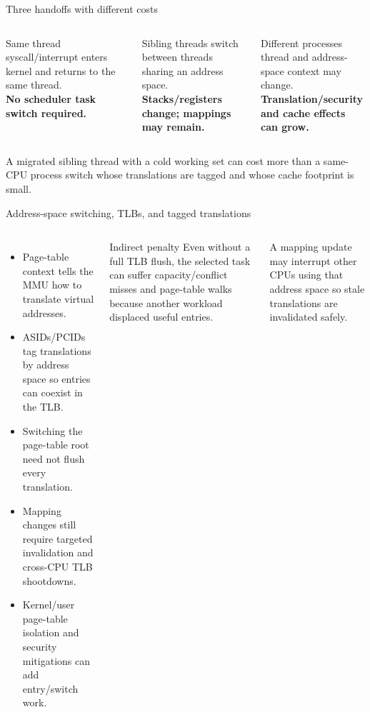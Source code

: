 \documentclass[aspectratio=169,11pt]{beamer}
\begin{document}
\begin{frame}{Three handoffs with different costs}
  \begin{columns}[T,onlytextwidth]
      \begin{block}{Same thread}
        syscall/interrupt enters kernel and returns to the same thread.\\[.4em]
        \textbf{No scheduler task switch required.}
      \end{block}
      \begin{block}{Sibling threads}
        switch between threads sharing an address space.\\[.4em]
        \textbf{Stacks/registers change; mappings may remain.}
      \end{block}
      \begin{block}{Different processes}
        thread and address-space context may change.\\[.4em]
        \textbf{Translation/security and cache effects can grow.}
      \end{block}
  \end{columns}
  \begin{tcolorbox}[title=But do not rank blindly]
    A migrated sibling thread with a cold working set can cost more than a same-CPU process switch whose translations are tagged and whose cache footprint is small.
  \end{tcolorbox}
\end{frame}

\begin{frame}{Address-space switching, TLBs, and tagged translations}
  \begin{columns}[T,onlytextwidth]
      \begin{itemize}
        \item Page-table context tells the MMU how to translate virtual addresses.
        \item ASIDs/PCIDs tag translations by address space so entries can coexist in the TLB.
        \item Switching the page-table root need not flush every translation.
        \item Mapping changes still require targeted invalidation and cross-CPU TLB shootdowns.
        \item Kernel/user page-table isolation and security mitigations can add entry/switch work.
      \end{itemize}
      \begin{alertblock}{Indirect penalty}
        Even without a full TLB flush, the selected task can suffer capacity/conflict misses and page-table walks because another workload displaced useful entries.
      \end{alertblock}
      \begin{tcolorbox}[title=Multicore detail]
        A mapping update may interrupt other CPUs using that address space so stale translations are invalidated safely.
      \end{tcolorbox}
  \end{columns}
\end{frame}
\end{document}
